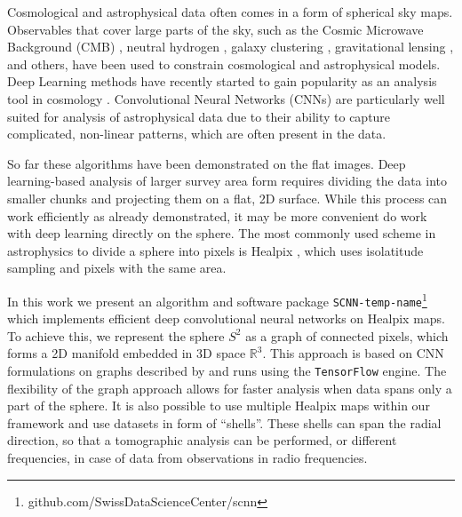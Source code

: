 \documentclass[final,twocolumn,3p,times,authoryear]{elsarticle}
\newcommand{\1}{\b{1}}              %
\newcommand{\0}{\b{0}}              %
\newcommand{\pkg}[1]{\texttt{#1}}
\begin{document}

Cosmological and astrophysical data often comes in a form of spherical sky maps.
Observables that cover large parts of the sky, such as the Cosmic Microwave Background (CMB) \citep{planck2015cosmologicalparameters,komatsu2011sevenyear,staggs2018recentdiscoveries}, neutral hydrogen \citep{santos2015cosmologySKA,HI4PI2016fullskyHI}, galaxy clustering \citep{alam2017clusteringgalaxies}, gravitational lensing \citep{troxel2017darkenergy,hildebrandt2017kidscosmological}, and others, have been used to constrain cosmological and astrophysical models. Deep Learning methods have recently started to gain popularity as an analysis tool in cosmology \citep{schmelze2017cosmologicalmodel,luciesmith2018machinelearning,gupta2018nongaussianinformation,gillet2018deeplearning,hassan2018reionizationmodels,aragoncalvo2018classyfyinglarge,ciuca2017cnnstring}.
Convolutional Neural Networks (CNNs) are particularly well suited for analysis of astrophysical data due to their ability to capture complicated, non-linear patterns, which are often present in the data.

So far these algorithms have been demonstrated on the flat images.
Deep learning-based analysis of larger survey area form requires dividing the data into smaller chunks and projecting them on a flat, 2D surface.
While this process can work efficiently as already demonstrated, it may be more convenient do work with deep learning directly on the sphere.
The most commonly used scheme in astrophysics to divide a sphere into pixels is Healpix \citep{gorski2005healpix}, which uses isolatitude sampling and pixels with the same area.

In this work we present an algorithm and software package \pkg{SCNN-temp-name}\footnote{github.com/SwissDataScienceCenter/scnn} which implements efficient deep convolutional neural networks on Healpix maps.
To achieve this, we represent the sphere $S^2$ as a graph of connected pixels, which forms a 2D manifold embedded in 3D space $\mathbb{R}^3$.
This approach is based on CNN formulations on graphs described by \citet{defferrard2016convolutional} and runs using the \pkg{TensorFlow} \citep{abadi2016tensorflow} engine.
The flexibility of the graph approach allows for faster analysis when data spans only a part of the sphere.
It is also possible to use multiple Healpix maps within our framework and use datasets in form of ``shells''.
These shells can span the radial direction, so that a tomographic analysis can be performed, or different frequencies, in case of data from observations in radio frequencies.
\end{document}
